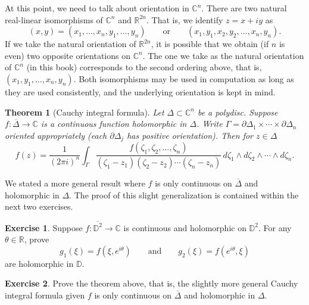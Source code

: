 \documentclass[12pt,openany]{book}
\newcommand{\C}{{\mathbb{C}}}
\newcommand{\R}{{\mathbb{R}}}
\newcommand{\D}{{\mathbb{D}}}
\theoremstyle{plain}
\newtheorem{thm}{Theorem}[section]
\theoremstyle{remark}
\theoremstyle{definition}
\newenvironment{exbox}{%
    \def\FrameCommand{\vrule width 1pt \relax\hspace {10pt}}%
    \MakeFramed {\advance \hsize -\width \FrameRestore }%
}{%
    \endMakeFramed
}
\theoremstyle{exercise}
\newtheorem{exercise}{Exercise}[section]
\theoremstyle{example}
\begin{document}
At this point, we need to talk about orientation in $\C^n$.  There are two
natural real-linear isomorphisms of $\C^n$ and $\R^{2n}$.  That is, we
identify $z = x+iy$ as
\begin{equation*}
(x,y) = (x_1,\ldots,x_n,y_1,\ldots,y_n) \qquad
\text{or} \qquad
(x_1,y_1,x_2,y_2,\ldots,x_n,y_n) .
\end{equation*}
If we take the natural orientation of $\R^{2n}$,
it is possible that we obtain (if $n$ is even)
two opposite orientations on $\C^n$.
The one we take as the natural orientation of $\C^n$ (in this book)
corresponds to
the second ordering above, that
is, $(x_1,y_1,\ldots,x_n,y_n)$.  Both isomorphisms may be used
in computation as long as they are used consistently, and the underlying
orientation is kept in mind.

\begin{thm}[Cauchy integral formula]
Let $\Delta \subset \C^n$ be a polydisc. 
Suppose
$f \colon \overline{\Delta} \to \C$ is a continuous function
holomorphic in $\Delta$.
Write $\Gamma = \partial \Delta_1 \times \cdots \times \partial \Delta_n$
oriented appropriately (each $\partial \Delta_j$ has positive orientation).
Then for $z \in \Delta$
\begin{equation*}
f(z) =
\frac{1}{{(2\pi i)}^n}
\int_{\Gamma}
\frac{f(\zeta_1,\zeta_2,\ldots,\zeta_n)}{(\zeta_1-z_1)(\zeta_2-z_2)\cdots(\zeta_n-z_n)}
\,
d \zeta_1 
\wedge
d \zeta_2
\wedge
\cdots
\wedge
d \zeta_n .
\end{equation*}
\end{thm}

We stated a more general result where $f$ is only continuous 
on $\overline{\Delta}$ and holomorphic in $\Delta$.  The proof of this
slight generalization is contained within the next two exercises.

\begin{exbox}
\begin{exercise}
Suppose $f \colon \overline{\D^2} \to \C$ is continuous and holomorphic
on $\D^2$.  For any $\theta \in \R$, prove
\begin{equation*}
g_1(\xi) = f(\xi,e^{i\theta}) \qquad \text{and} \qquad
g_2(\xi) = f(e^{i\theta},\xi)
\end{equation*}
are holomorphic in $\D$.
\end{exercise}

\begin{exercise}
Prove the theorem above, that is, the slightly more general Cauchy integral
formula given $f$ is only continuous on $\overline{\Delta}$ and
holomorphic in $\Delta$.
\end{exercise}
\end{exbox}
\end{document}

